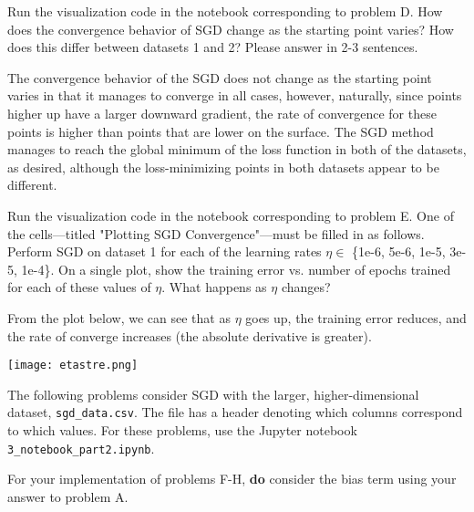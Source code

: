 \documentclass{article}
\begin{document}
\begin{problem}[2]
  Run the visualization code in the notebook corresponding to problem D. How does the convergence behavior of SGD change as the starting point varies? How does this differ between datasets 1 and 2? Please answer in 2-3 sentences.
\end{problem}
\begin{solution}
The convergence behavior of the SGD does not change as the starting point varies in that it manages to converge in all cases, however, naturally, since points higher up have a larger downward gradient, the rate of convergence for these points is higher than points that are lower on the surface. The SGD method manages to reach the global minimum of the loss function in both of the datasets, as desired, although the loss-minimizing points in both datasets appear to be different. 
\end{solution}
\newpage
\begin{problem}[6]
  Run the visualization code in the notebook corresponding to problem E. One of the cells---titled "Plotting SGD Convergence"---must be filled in as follows. Perform SGD on dataset 1 for each of the learning rates $\eta \in$ \{1e-6, 5e-6, 1e-5, 3e-5, 1e-4\}. On a single plot, show the training error vs. number of epochs trained for each of these values of $\eta$. What happens as $\eta$ changes?
\end{problem}
\begin{solution}
From the plot below, we can see that as $\eta$ goes up, the training error reduces, and  the rate of converge increases (the absolute derivative is greater).
\begin{center}
    \texttt{[image: etastre.png]}

\end{center}
\end{solution}


The following problems consider SGD with the larger, higher-dimensional dataset, \texttt{sgd_data.csv}. The file has a header denoting which columns correspond to which values. For these problems, use the Jupyter notebook \texttt{3_notebook_part2.ipynb}.

For your implementation of problems F-H, \textbf{do} consider the bias term using your answer to problem A.
\end{document}
